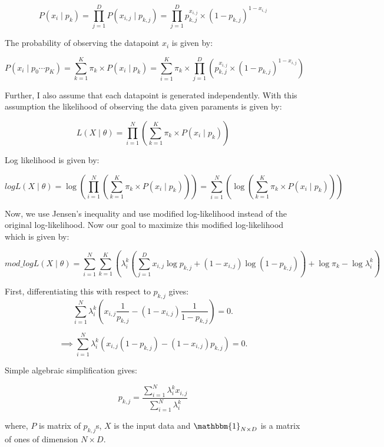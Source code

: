 $$
	P(x_i \mid p_k) = \prod_{j = 1}^D P(x_{i, j} \mid p_{k, j}) 
	= \prod_{j = 1}^D p_{k, j}^{x_{i, j}} \times (1 - p_{k, j})^{1 - x_{i, j}}
$$

The probability of observing the datapoint $x_i$ is given by:

$$
	P(x_i \mid p_0 \cdots p_K) = \sum_{k = 1}^{K} \pi_k \times P(x_i \mid p_k)
	= \sum_{i = 1}^{K} \pi_k \times \prod_{j = 1}^D \left( p_{k, j}^{x_{i, j}} \times (1 - p_{k, j})^{1 - x_{i, j}} \right)
$$

Further, I also assume that each datapoint is generated independently. With this assumption the likelihood of observing the data given paraments is given by:

$$
	L(X\mid \theta) = \prod_{i = 1}^{N}\left(\sum_{k = 1}^{K} \pi_k \times P(x_i \mid p_k)\right)
$$

Log likelihood is given by:

$$
	logL(X \mid \theta) = \log\left(\prod_{i = 1}^{N}\left(\sum_{k = 1}^{K} \pi_k \times P(x_i \mid p_k)\right)\right)
	= \sum_{i=1}^{N}\left(\log\left(\sum_{k = 1}^{K} \pi_k \times P(x_i \mid p_k)\right)\right)
$$

Now, we use Jensen's inequality and use modified log-likelihood instead of the original log-likelihood. Now our goal to maximize this modified log-likelihood which is given by:

$$
mod\_logL(X \mid \theta) = \sum_{i = 1}^{N} \sum_{k = 1}^{K}\left(
	\lambda_i^k\left(
		\sum_{j = 1}^{D} x_{i, j} \log p_{k, j} + (1 - x_{i, j})\log(1-p_{k, j})
\right)
	+ \log \pi_k - \log\lambda_i^k
\right)
$$

First, differentiating this with respect to $p_{k, j}$ gives:\\

$$
	\sum_{i = 1}^{N} \lambda_i^k \left(x_{i, j}\frac{1}{p_{k, j}} 
	- (1 - x_{i, j})\frac{1}{1 - p_{k, j}}\right) = 0.
$$

$$
	\implies \sum_{i = 1}^{N} \lambda_i^k \left(x_{i, j}(1 - p_{k, j})
	- (1 - x_{i, j})p_{k, j}\right) = 0.
$$

Simple algebraic simplification gives:

$$
	p_{k, j} = \frac{\sum_{i = 1}^N \lambda_i^k x_{i, j}}{\sum_{i = 1}^{N} \lambda_i^k}
$$



where, $P$ is matrix of $p_{k, j}$s, $X$ is the input data and $\mathbbm{1}_{N\times D}$ is a matrix of ones of dimension $N \times D$.


